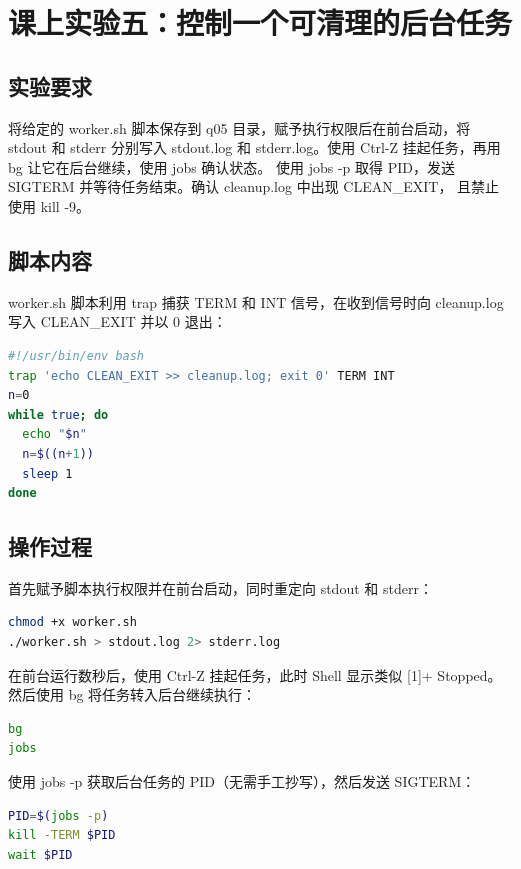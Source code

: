 \documentclass[UTF8]{ctexart}
\begin{document}

\section{课上实验五：控制一个可清理的后台任务}

\subsection{实验要求}

将给定的 worker.sh 脚本保存到 q05 目录，赋予执行权限后在前台启动，将 stdout 和 stderr 分别写入
stdout.log 和 stderr.log。使用 Ctrl-Z 挂起任务，再用 bg 让它在后台继续，使用 jobs 确认状态。
使用 jobs -p 取得 PID，发送 SIGTERM 并等待任务结束。确认 cleanup.log 中出现 CLEAN\_EXIT，
且禁止使用 kill -9。

\subsection{脚本内容}

worker.sh 脚本利用 trap 捕获 TERM 和 INT 信号，在收到信号时向 cleanup.log 写入 CLEAN\_EXIT
并以 0 退出：

\begin{lstlisting}[language=bash]
#!/usr/bin/env bash
trap 'echo CLEAN_EXIT >> cleanup.log; exit 0' TERM INT
n=0
while true; do
  echo "$n"
  n=$((n+1))
  sleep 1
done
\end{lstlisting}

\subsection{操作过程}

首先赋予脚本执行权限并在前台启动，同时重定向 stdout 和 stderr：

\begin{lstlisting}[language=bash]
chmod +x worker.sh
./worker.sh > stdout.log 2> stderr.log
\end{lstlisting}

在前台运行数秒后，使用 Ctrl-Z 挂起任务，此时 Shell 显示类似 [1]+ Stopped。
然后使用 bg 将任务转入后台继续执行：

\begin{lstlisting}[language=bash]
bg
jobs
\end{lstlisting}

使用 jobs -p 获取后台任务的 PID（无需手工抄写），然后发送 SIGTERM：

\begin{lstlisting}[language=bash]
PID=$(jobs -p)
kill -TERM $PID
wait $PID
\end{lstlisting}
\end{document}
